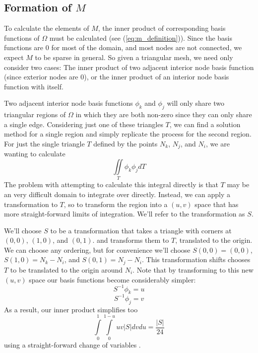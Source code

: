 \subsection{Formation of $M$}
To calculate the elements of $M$, the inner product of corresponding basis functions of $\Omega$ must be calculated
(see (\ref{eq:m_definition})). Since the basis functions are 0 for most of the domain, and most nodes are not
connected, we expect $M$ to be sparse in general. So given a triangular mesh, we need only consider two cases: The inner
product of two adjacent interior node basis function (since exterior nodes are 0), or the inner product of an interior
node basis function with itself.

Two adjacent interior node basis functions $\phi_k$ and $\phi_j$ will only share two triangular
regions of $\Omega$ in which they are both non-zero since they can only share a single edge. Considering just one of these
triangles $T$, we can find a solution method for a
single region and simply replicate the process for the second region. For just the single triangle $T$ defined by the points
$N_k$, $N_j$, and $N_i$, we are wanting to calculate
\begin{equation}
\iint\limits_T \phi_k \phi_j dT
\end{equation}
The problem with attempting to calculate this integral directly is that $T$ may be an very difficult domain to integrate over
directly. Instead, we can apply a transformation to $T$, so to transform the region into a $(u,v)$ space that
has more straight-forward limits of integration. We'll refer to the transformation as $S$.

We'll choose $S$ to be a transformation that takes a triangle with corners at $(0,0)$, $(1,0)$, and $(0,1)$. and
transforms them to $T$, translated to the origin. We can choose any ordering, but for convenience we'll choose 
$S(0, 0) = (0,0)$, $S(1, 0) = N_k - N_i$, and $S(0, 1) = N_j - N_i$. This transformation shifts chooses $T$ to be
translated to the origin around $N_i$. Note that
by transforming to this new $(u,v)$ space our basis functions become considerably simpler:
\begin{equation}
S^{-1}\phi_k = u
\end{equation}
\begin{equation}
S^{-1}\phi_j = v
\end{equation}
As a result, our inner product simplifies too
\begin{equation}
\int\limits_0^1 \int\limits_0^{1-u} uv |S| dv du = \frac{|S|}{24}
\end{equation}
using a straight-forward change of variables \cite{change_of_variables}.

